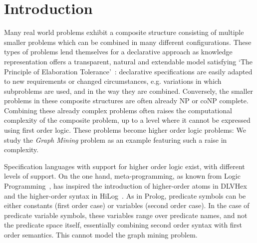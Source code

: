 \vspace{-1em}
\section{Introduction}
Many real world problems exhibit a composite structure consisting of multiple smaller problems which can be combined in many different configurations.
These types of problems lend themselves for a declarative approach as knowledge representation offers a transparent, natural and extendable model satisfying `The Principle of Elaboration Tolerance'~\citep{elaboration_tolerance}: 
declarative specifications are 
easily
adapted to new requirements or changed circumstances, e.g. variations in which subproblems are used, and in the way they are combined.
Conversely, the smaller problems in these composite structures are often already NP or coNP complete.
Combining these already complex problems often raises the computational complexity of the composite problem, up to a level where it cannot be expressed using first order logic.
These problems become higher order logic problems: We study the \emph{Graph Mining} problem as an example featuring such a raise in complexity.

Specification languages with support for higher order logic exist, with different levels of support.
On the one hand, meta-programming, as known from Logic Programming~\citep{abramson1989meta}, has inspired the introduction of higher-order atoms in DLVHex~\citep{conf/ijcai/EiterIST05}  and the higher-order syntax in HiLog~\citep{chen1993hilog}.
As in Prolog, predicate symbols can be either constants (first order case) or variables (second order case).
In the case of predicate variable symbols, these variables range over predicate names, and not the predicate space itself, essentially combining second order syntax with first order semantics. 
This cannot model the graph mining problem.

